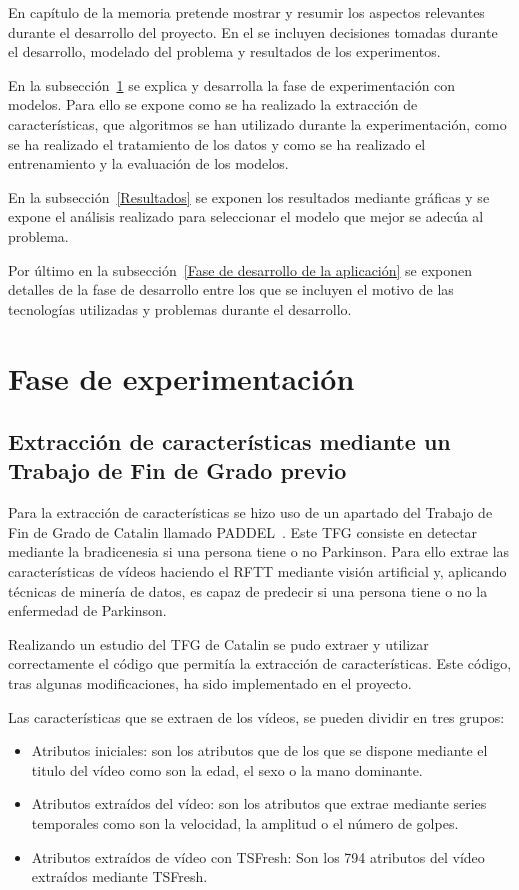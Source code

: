 
En capítulo de la memoria pretende mostrar y resumir los aspectos relevantes durante el desarrollo del proyecto. En el se incluyen decisiones tomadas durante el desarrollo, modelado del problema y resultados de los experimentos.

En la subsección~\ref{Fase de experimentación} se explica y desarrolla la fase de experimentación con modelos. Para ello se expone como se ha realizado la extracción de características, que algoritmos se han utilizado durante la experimentación, como se ha realizado el tratamiento de los datos y como se ha realizado el entrenamiento y la evaluación de los modelos.

En la subsección~\ref{Resultados} se exponen los resultados mediante gráficas y se expone el análisis realizado para seleccionar el modelo que mejor se adecúa al problema.

Por último en la subsección~\ref{Fase de desarrollo de la aplicación} se exponen detalles de la fase de desarrollo entre los que se incluyen el motivo de las tecnologías utilizadas y problemas durante el desarrollo.

\section{Fase de experimentación}
\label{Fase de experimentación}
\subsection{Extracción de características mediante un Trabajo de Fin de Grado previo}

Para la extracción de características se hizo uso de un apartado del Trabajo de Fin de Grado de Catalin llamado PADDEL~\cite{paddelRepo}. Este TFG consiste en detectar mediante la bradicenesia si una persona tiene o no Parkinson. Para ello extrae las características de vídeos haciendo el RFTT mediante visión artificial y, aplicando técnicas de minería de datos, es capaz de predecir si una persona tiene o no la enfermedad de Parkinson.

Realizando un estudio del TFG de Catalin se pudo extraer y utilizar correctamente el código que permitía la extracción de características. Este código, tras algunas modificaciones, ha sido implementado en el proyecto.

Las características que se extraen de los vídeos, se pueden dividir en tres grupos:
\begin{itemize}
\item Atributos iniciales: son los atributos que de los que se dispone mediante el titulo del vídeo como son la edad, el sexo o la mano dominante.
\item Atributos extraídos del vídeo: son los atributos que extrae mediante series temporales como son la velocidad, la amplitud o el número de golpes.
\item Atributos extraídos de vídeo con TSFresh: Son los 794 atributos
del vídeo extraídos mediante TSFresh.
\end{itemize}


